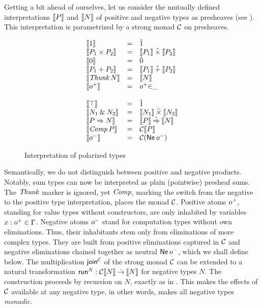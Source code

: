 \documentclass[sigplan,screen,fleqn,review]{acmart} %
\begin{document}
Getting a bit ahead of ourselves, let us consider the
mutually defined interpretations
$\den P$ and $\den N$ of positive and negative types as presheaves
(see ).
This interpretation is parametrized by a strong monad $\C$ on
presheaves.
\begin{figure}[htbp]
\centering
\hrulefill
$$
\begin{array}{lcl}
  \den{\tyone} & = & \hatone \\
  \den{P_1 \times P_2} & = & \den{P_1} \hattimes \den{P_2} \\
  \den{\tyzero} & = & \hatzero \\
  \den{P_1 + P_2} & = & \den{P_1} \hatplus \den{P_2} \\
  \den{\Thunk N} & = & \den N \\
  \den{\patom} & = & \patom{\in}\_ \\
\\
  \den{\top} & = & \hatone \\
  \den{N_1 \ntimes N_2} & = & \den{N_1} \hattimes \den{N_2} \\
  \den{P \To N} & = & \den P \hatto \den N \\
  \den{\Comp P} & = & \C \den P \\
  \den{\natom}  & = & \C (\tNe\, \natom) \\
\end{array}
$$
\hrulefill
  \caption{Interpretation of polarized types}
  \label{fig:tyint}
\end{figure}
Semantically, we do not distinguish between positive and negative
products.  Notably, sum types can now be interpreted as plain
(pointwise) presheaf
sums.  The $\tThunk$ marker is ignored, yet $\tComp$, marking the
switch from the negative to the positive type interpretation, places
the monad $\C$.  Positive atoms $\patom$, standing for value types without
constructors, are only inhabited by variables $x : \patom \in \Gamma$.
Negative atoms $\natom$ stand for computation types without own eliminations.
Thus, their inhabitants stem only from eliminations of more complex
types.  They are built from positive eliminations captured in $\C$ and negative
eliminations chained together as neutral $\tNe\,\natom$, which we
shall define below.
The multiplication $\tjoin[\C]$ of the strong monad $\C$ can be
extended to a natural transformation
$\trun^N : \C \den N \todot \den N$ for negative types $N$.
The construction proceeds by recursion on $N$, exactly as in .
This makes the effects of $\C$ available at any negative type,
in other words, makes all negative types \emph{monadic}.
\end{document}
